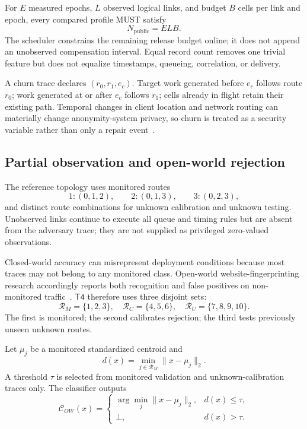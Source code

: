 \documentclass[11pt,oneside]{article}
\newcommand{\Tfour}{\ensuremath{\mathsf{T4}}}
\begin{document}
For $E$ measured epochs, $L$ observed logical links, and budget $B$ cells per link and epoch, every compared profile MUST satisfy
\begin{equation}
  N_{\mathrm{public}}=ELB.
\label{eq:t4budget}
\end{equation}
The scheduler constrains the remaining release budget online; it does not append an unobserved compensation interval. Equal record count removes one trivial feature but does not equalize timestamps, queueing, correlation, or delivery.

A churn trace declares $(r_0,r_1,e_c)$. Target work generated before $e_c$ follows route $r_0$; work generated at or after $e_c$ follows $r_1$; cells already in flight retain their existing path. Temporal changes in client location and network routing can materially change anonymity-system privacy, so churn is treated as a security variable rather than only a repair event~\cite{tempest2018}.

\subsection{Partial observation and open-world rejection}

The reference topology uses monitored routes
\begin{equation}
  1:(0,1,2),\qquad 2:(0,1,3),\qquad 3:(0,2,3),
\label{eq:t4monitored}
\end{equation}
and distinct route combinations for unknown calibration and unknown testing. Unobserved links continue to execute all queue and timing rules but are absent from the adversary trace; they are not supplied as privileged zero-valued observations.

Closed-world accuracy can misrepresent deployment conditions because most traces may not belong to any monitored class. Open-world website-fingerprinting research accordingly reports both recognition and false positives on non-monitored traffic~\cite{wang2014wf,onlinewf,gtt23,realitycheck2026}. \Tfour{} therefore uses three disjoint sets:
\begin{equation}
  \mathcal R_M=\{1,2,3\},\quad
  \mathcal R_C=\{4,5,6\},\quad
  \mathcal R_U=\{7,8,9,10\}.
\label{eq:t4splits}
\end{equation}
The first is monitored; the second calibrates rejection; the third tests previously unseen unknown routes.

Let $\mu_j$ be a monitored standardized centroid and
\begin{equation}
  d(x)=\min_{j\in\mathcal R_M}\lVert x-\mu_j\rVert_2.
\label{eq:t4distance}
\end{equation}
A threshold $\tau$ is selected from monitored validation and unknown-calibration traces only. The classifier outputs
\begin{equation}
  \mathcal C_{OW}(x)=
  \begin{cases}
    \arg\min_j\lVert x-\mu_j\rVert_2, & d(x)\le\tau,\\
    \bot, & d(x)>\tau.
  \end{cases}
\label{eq:t4openworld}
\end{equation}
\end{document}
